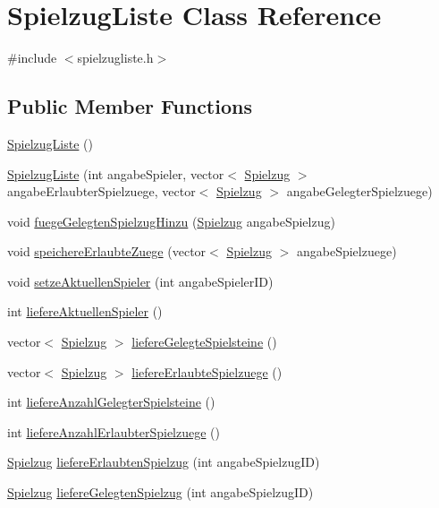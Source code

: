 \hypertarget{classSpielzugListe}{\section{Spielzug\-Liste Class Reference}
\label{classSpielzugListe}
}


{\ttfamily \#include $<$spielzugliste.\-h$>$}

\subsection*{Public Member Functions}
\begin{DoxyCompactItemize}
\item 
\hyperlink{classSpielzugListe_a2c1a6281507b6915e42658dbcd6ee4b3}{Spielzug\-Liste} ()
\item 
\hyperlink{classSpielzugListe_a1572de2f17f8ee3a82586701254c8cdb}{Spielzug\-Liste} (int angabe\-Spieler, vector$<$ \hyperlink{classSpielzug}{Spielzug} $>$ angabe\-Erlaubter\-Spielzuege, vector$<$ \hyperlink{classSpielzug}{Spielzug} $>$ angabe\-Gelegter\-Spielzuege)
\item 
void \hyperlink{classSpielzugListe_ab6bfef73458e7f9cb8d97910ee772768}{fuege\-Gelegten\-Spielzug\-Hinzu} (\hyperlink{classSpielzug}{Spielzug} angabe\-Spielzug)
\item 
void \hyperlink{classSpielzugListe_a1f5aa551cab505be627ddbe2517fa7d5}{speichere\-Erlaubte\-Zuege} (vector$<$ \hyperlink{classSpielzug}{Spielzug} $>$ angabe\-Spielzuege)
\item 
void \hyperlink{classSpielzugListe_a8ce17aeece8a1f2c524345d619a355aa}{setze\-Aktuellen\-Spieler} (int angabe\-Spieler\-I\-D)
\item 
int \hyperlink{classSpielzugListe_aaef345f916807f02a2a3e02d19a0a0c8}{liefere\-Aktuellen\-Spieler} ()
\item 
vector$<$ \hyperlink{classSpielzug}{Spielzug} $>$ \hyperlink{classSpielzugListe_a8f78fdbaafe326674840813abb93e65e}{liefere\-Gelegte\-Spielsteine} ()
\item 
vector$<$ \hyperlink{classSpielzug}{Spielzug} $>$ \hyperlink{classSpielzugListe_ae8e860519b639d84ae3b108695afcb34}{liefere\-Erlaubte\-Spielzuege} ()
\item 
int \hyperlink{classSpielzugListe_add035f29dd46a529d7e8bb52815bd2ee}{liefere\-Anzahl\-Gelegter\-Spielsteine} ()
\item 
int \hyperlink{classSpielzugListe_a8a80a622dcde2bfd5d9008e7802820c3}{liefere\-Anzahl\-Erlaubter\-Spielzuege} ()
\item 
\hyperlink{classSpielzug}{Spielzug} \hyperlink{classSpielzugListe_aba3deda010487b0d9b00ac7bbbb2883f}{liefere\-Erlaubten\-Spielzug} (int angabe\-Spielzug\-I\-D)
\item 
\hyperlink{classSpielzug}{Spielzug} \hyperlink{classSpielzugListe_a8c7a7f424bb546c1b9dda98616054f78}{liefere\-Gelegten\-Spielzug} (int angabe\-Spielzug\-I\-D)
\end{DoxyCompactItemize}


